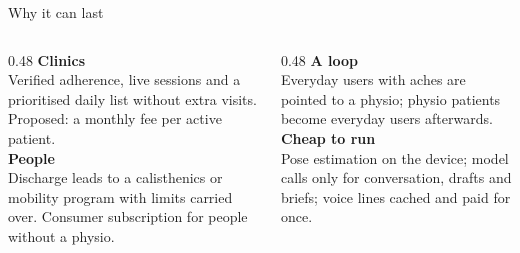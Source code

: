\documentclass[aspectratio=169,9pt]{beamer}
\begin{document}
\begin{frame}{Why it can last}
\begin{columns}[t]
\begin{column}{0.48\textwidth}
  \textbf{\color{accent}Clinics}\\
  Verified adherence, live sessions and a prioritised daily list without extra visits. Proposed: a monthly fee per active patient.\\[10pt]
  \textbf{\color{accent}People}\\
  Discharge leads to a calisthenics or mobility program with limits carried over. Consumer subscription for people without a physio.
\end{column}
\begin{column}{0.48\textwidth}
  \textbf{\color{accent}A loop}\\
  Everyday users with aches are pointed to a physio; physio patients become everyday users afterwards.\\[10pt]
  \textbf{\color{accent}Cheap to run}\\
  Pose estimation on the device; model calls only for conversation, drafts and briefs; voice lines cached and paid for once.
\end{column}
\end{columns}
\end{frame}
\end{document}
